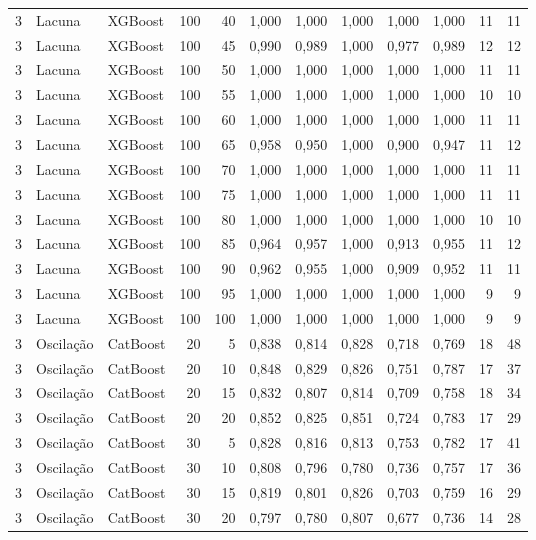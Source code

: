 \begin{longtable}{@{}rllrrrrrrrrr@{}}
3 & Lacuna & XGBoost & 100 & 40 & 1,000 & 1,000 & 1,000 & 1,000 & 1,000 & 11 & 11 \\
3 & Lacuna & XGBoost & 100 & 45 & 0,990 & 0,989 & 1,000 & 0,977 & 0,989 & 12 & 12 \\
3 & Lacuna & XGBoost & 100 & 50 & 1,000 & 1,000 & 1,000 & 1,000 & 1,000 & 11 & 11 \\
3 & Lacuna & XGBoost & 100 & 55 & 1,000 & 1,000 & 1,000 & 1,000 & 1,000 & 10 & 10 \\
3 & Lacuna & XGBoost & 100 & 60 & 1,000 & 1,000 & 1,000 & 1,000 & 1,000 & 11 & 11 \\
3 & Lacuna & XGBoost & 100 & 65 & 0,958 & 0,950 & 1,000 & 0,900 & 0,947 & 11 & 12 \\
3 & Lacuna & XGBoost & 100 & 70 & 1,000 & 1,000 & 1,000 & 1,000 & 1,000 & 11 & 11 \\
3 & Lacuna & XGBoost & 100 & 75 & 1,000 & 1,000 & 1,000 & 1,000 & 1,000 & 11 & 11 \\
3 & Lacuna & XGBoost & 100 & 80 & 1,000 & 1,000 & 1,000 & 1,000 & 1,000 & 10 & 10 \\
3 & Lacuna & XGBoost & 100 & 85 & 0,964 & 0,957 & 1,000 & 0,913 & 0,955 & 11 & 12 \\
3 & Lacuna & XGBoost & 100 & 90 & 0,962 & 0,955 & 1,000 & 0,909 & 0,952 & 11 & 11 \\
3 & Lacuna & XGBoost & 100 & 95 & 1,000 & 1,000 & 1,000 & 1,000 & 1,000 & 9 & 9 \\
3 & Lacuna & XGBoost & 100 & 100 & 1,000 & 1,000 & 1,000 & 1,000 & 1,000 & 9 & 9 \\
3 & Oscilação & CatBoost & 20 & 5 & 0,838 & 0,814 & 0,828 & 0,718 & 0,769 & 18 & 48 \\
3 & Oscilação & CatBoost & 20 & 10 & 0,848 & 0,829 & 0,826 & 0,751 & 0,787 & 17 & 37 \\
3 & Oscilação & CatBoost & 20 & 15 & 0,832 & 0,807 & 0,814 & 0,709 & 0,758 & 18 & 34 \\
3 & Oscilação & CatBoost & 20 & 20 & 0,852 & 0,825 & 0,851 & 0,724 & 0,783 & 17 & 29 \\
3 & Oscilação & CatBoost & 30 & 5 & 0,828 & 0,816 & 0,813 & 0,753 & 0,782 & 17 & 41 \\
3 & Oscilação & CatBoost & 30 & 10 & 0,808 & 0,796 & 0,780 & 0,736 & 0,757 & 17 & 36 \\
3 & Oscilação & CatBoost & 30 & 15 & 0,819 & 0,801 & 0,826 & 0,703 & 0,759 & 16 & 29 \\
3 & Oscilação & CatBoost & 30 & 20 & 0,797 & 0,780 & 0,807 & 0,677 & 0,736 & 14 & 28 \\

\end{longtable}
